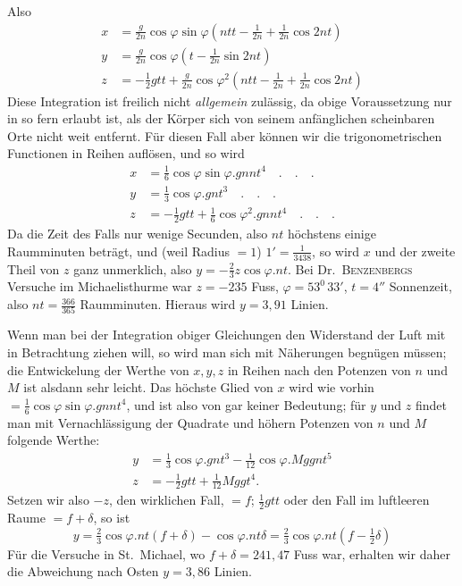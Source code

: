 Also
\[
\begin{aligned}
x&=\tfrac{g}{2n}\cos\varphi\sin\varphi(ntt-\tfrac{1}{2n}+\tfrac{1}{2n}\cos2nt)\\
y&=\tfrac{g}{2n}\cos\varphi(t-\tfrac{1}{2n}\sin2nt)\\
z&=-\tfrac12gtt+\tfrac{g}{2n}\cos\varphi^2(ntt-\tfrac{1}{2n}+\tfrac{1}{2n}\cos2nt)
\end{aligned}
\]
Diese Integration ist freilich nicht \textit{allgemein} zulässig, da obige Voraussetzung nur in so fern erlaubt ist, als der Körper sich von seinem anfänglichen scheinbaren Orte nicht weit entfernt. Für diesen Fall aber können wir die trigonometrischen Functionen in Reihen auflösen, und so wird
\[
\begin{aligned}
x&=\tfrac16\cos\varphi\sin\varphi.gnnt^4\quad.\quad.\quad.\\
y&=\tfrac13\cos\varphi.gnt^3\quad.\quad.\quad.\\
z&=-\tfrac12gtt+\tfrac16\cos\varphi^2.gnnt^4\quad.\quad.\quad.
\end{aligned}
\]
Da die Zeit des Falls nur wenige Secunden, also $nt$ höchstens einige Raumminuten beträgt, und (weil Radius $=1$) $1'=\tfrac{1}{3438}$, so wird $x$ und der zweite Theil von $z$ ganz unmerklich, also $y=-\tfrac23z\cos\varphi.nt$. Bei Dr.\ \textsc{Benzenbergs} Versuche im Michaelisthurme war $z=-235$ Fuss, $\varphi=53^0\,33'$, $t=4''$ Sonnenzeit, also $nt=\tfrac{366}{365}$ Raumminuten. Hieraus wird $y=3{,}91$ Linien.

\par\clearpage
{}
Wenn man bei der Integration obiger Gleichungen den Widerstand der Luft mit in Betrachtung ziehen will, so wird man sich mit Näherungen begnügen müssen; die Entwickelung der Werthe von $x,y,z$ in Reihen nach den Potenzen von $n$ und $M$ ist alsdann sehr leicht. Das höchste Glied von $x$ wird wie vorhin $=\tfrac16\cos\varphi\sin\varphi.gnnt^4$, und ist also von gar keiner Bedeutung; für $y$ und $z$ findet man mit Vernachlässigung der Quadrate und höhern Potenzen von $n$ und $M$ folgende Werthe:
\[
\begin{aligned}
y&=\tfrac13\cos\varphi.gnt^3-\tfrac{1}{12}\cos\varphi.Mggnt^5\\
z&=-\tfrac12gtt+\tfrac{1}{12}Mggt^4.
\end{aligned}
\]
Setzen wir also $-z$, den wirklichen Fall, $=f$; $\tfrac12gtt$ oder den Fall im luftleeren Raume $=f+\delta$, so ist
\[
y=\tfrac23\cos\varphi.nt(f+\delta)-\cos\varphi.nt\delta=\tfrac23\cos\varphi.nt(f-\tfrac12\delta)
\]
Für die Versuche in St.\ Michael, wo $f+\delta=241{,}47$ Fuss war, erhalten wir daher die Abweichung nach Osten $y=3{,}86$ Linien.

